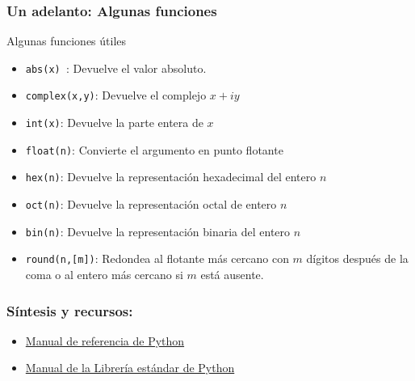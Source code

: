 \documentclass{beamer}
\begin{document}
\begin{frame}[fragile]
\frametitle{Un adelanto: Algunas funciones}

\begin{block}{Algunas funciones útiles}

\begin{itemize}
\item \texttt{abs(x) }: Devuelve el valor absoluto.
\item \texttt{complex(x,y)}: Devuelve el complejo $x+iy$
\item \texttt{int(x)}: Devuelve la parte entera de $x$
\item \texttt{float(n)}: Convierte el argumento en punto flotante
\item \texttt{hex(n)}: Devuelve la representación hexadecimal del entero $n$
\item \texttt{oct(n)}: Devuelve la representación octal de entero $n$
\item \texttt{bin(n)}: Devuelve la representación binaria del entero $n$
\item \texttt{round(n,[m])}: Redondea al flotante más cercano con $m$ dígitos después de la coma o al entero más cercano si $m$ está ausente.
\end{itemize}
\end{block}
\end{frame}

\begin{frame}
\frametitle{Síntesis y recursos:}

\begin{itemize}
\item \href{https://docs.python.org/3/reference/index.html}{Manual de referencia de Python}
\item \href{https://docs.python.org/3/library/index.html}{Manual de la Librería estándar de Python}
\end{itemize}
\end{frame}
\end{document}
